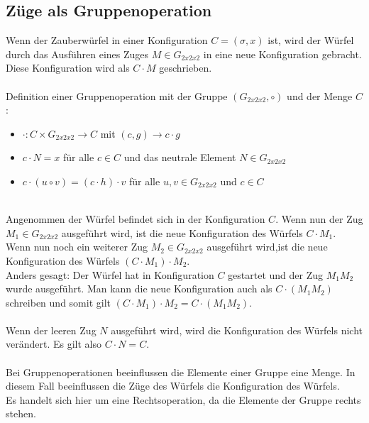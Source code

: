 \documentclass[12pt,a4paper, usenames, dvipsnames]{article}
\begin{document}












\subsection*{Züge als Gruppenoperation}

Wenn der Zauberwürfel in einer Konfiguration $C=(\sigma, x)$ ist, wird der Würfel durch das Ausführen eines Zuges $M \in G_{2x2x2}$ in eine neue Konfiguration gebracht. Diese Konfiguration wird als $C \cdot M$ geschrieben. \\
\\
Definition einer Gruppenoperation mit der Gruppe $(G_{2x2x2}, \circ)$ und der Menge $C$:
\begin{itemize}
\item $\cdot: C \times G_{2x2x2} \rightarrow C$ mit $(c, g) \rightarrow c \cdot g $
\item $c \cdot N = x$ für alle $c \in C$ und das neutrale Element $N \in G_{2x2x2}$  
\item $c \cdot (u \circ v) = (c \cdot h) \cdot v$ für alle $u, v \in G_{2x2x2}$ und $c \in C$
\end{itemize}
\ \\
Angenommen der Würfel befindet sich in der Konfiguration $C$. Wenn nun der Zug $M_1 \in G_{2x2x2}$ ausgeführt wird, ist die neue Konfiguration des Würfels $C \cdot M_1$. Wenn nun noch ein weiterer Zug $M_2 \in G_{2x2x2}$ ausgeführt wird,ist die neue Konfiguration des Würfels $(C \cdot M_1) \cdot M_2$. \\
Anders gesagt: Der Würfel hat in Konfiguration $C$ gestartet und der Zug $M_1 M_2$ wurde ausgeführt. Man kann die neue Konfiguration auch als $C \cdot (M_1 M_2)$ schreiben und somit gilt $(C \cdot M_1) \cdot M_2 = C \cdot (M_1 M_2)$. \\
\\
Wenn der leeren Zug $N$ ausgeführt wird, wird die Konfiguration des Würfels nicht verändert. Es gilt also $C \cdot N = C$. \\
\\
Bei Gruppenoperationen beeinflussen die Elemente einer Gruppe eine Menge. In diesem Fall beeinflussen die Züge des Würfels die Konfiguration des Würfels. \\
Es handelt sich hier um eine Rechtsoperation, da die Elemente der Gruppe rechts stehen. 
\end{document}
